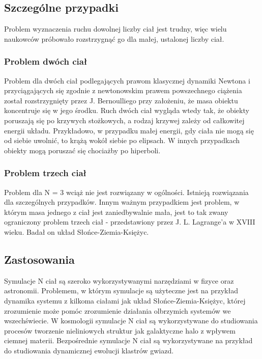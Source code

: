 \documentclass[14pt,twoside,a4paper]{article}
\begin{document}
\subsection{\Large Szczególne przypadki}
\bigskip
Problem wyznaczenia ruchu dowolnej liczby ciał jest trudny, więc wielu naukowców próbowało rozstrzygnąć go dla małej, ustalonej liczby ciał.

\subsubsection{Problem dwóch ciał}
Problem dla dwóch ciał podlegających prawom klasycznej dynamiki Newtona i przyciągających się zgodnie z newtonowskim prawem powszechnego ciążenia został rozstrzygnięty przez J. Bernoulliego przy założeniu, że masa obiektu koncentruje się w jego środku. \cite{fund}
Ruch dwóch ciał wygląda wtedy tak, że obiekty poruszają się po krzywych stożkowych, a rodzaj krzywej zależy od całkowitej energii układu. Przykładowo, w przypadku małej energii, gdy ciała nie mogą się od siebie uwolnić, to krążą wokół siebie po elipsach. W innych przypadkach obiekty mogą poruszać się chociażby po hiperboli. 

\subsubsection{Problem trzech ciał}
Problem dla N = 3 wciąż nie jest rozwiązany w ogólności. Istnieją rozwiązania dla szczególnych przypadków\cite{threebody1, threebody2}. Innym ważnym przypadkiem jest problem, w którym masa jednego z ciał jest zaniedbywalnie mała, jest to tak zwany ograniczony problem trzech ciał - przedstawiony przez J. L. Lagrange'a w XVIII wieku. Badał on układ Słońce-Ziemia-Księżyc. 


\subsection{\Large Zastosowania}
\bigskip
Symulacje N ciał są szeroko wykorzystywanymi narzędziami w fizyce oraz astronomii. Problemem, w którym symulacje są użyteczne jest na przykład dynamika systemu z kilkoma ciałami jak układ Słońce-Ziemia-Księżyc\cite{SEMmisc}, której zrozumienie może pomóc zrozumienie działania olbrzymich systemów we wszechświecie.\cite{chaosMisc}
W kosmologii symulacje N ciał są wykorzystywane do studiowania procesów tworzenie nieliniowych struktur jak galaktyczne halo z wpływem ciemnej materii\cite{haloDensity}. 
Bezpośrednie symulacje N ciał są wykorzystywane na przykład do studiowania dynamicznej ewolucji klastrów gwiazd.\cite{dirNBody} 
\newpage
\end{document}
